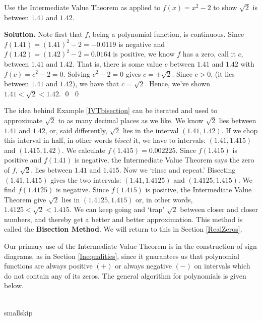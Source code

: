 

\begin{ex} \label{IVTbisection} Use the Intermediate Value Theorem as applied to $f(x) = x^2-2$ to show $\sqrt{2}$ is between $1.41$ and $1.42$.

\smallskip

{\bf Solution.} Note first that $f$, being a polynomial function, is continuous.  Since  $f(1.41) = (1.41)^2-2 = -0.0119$ is negative and $f(1.42) = (1.42)^2  -2 = 0.0164$ is positive, we know $f$ has a zero, call it $c$,  between $1.41$ and $1.42$.  That is, there is some value $c$ between $1.41$ and $1.42$ with  $f(c) = c^2-2 =0$. Solving $c^2-2 = 0$ gives $c = \pm \sqrt{2}$.  Since $c > 0$, (it lies between $1.41$ and $1.42$), we have that $c = \sqrt{2}$.  Hence, we've shown $1.41 < \sqrt{2} < 1.42$. \qed
\qed

\end{ex}

The idea behind Example \ref{IVTbisection}  can be iterated and used to approximate $\sqrt{2}$ to as many decimal places as we like. We know $\sqrt{2}$ lies between $1.41$ and $1.42$, or, said differently, $\sqrt{2}$ lies in the interval $(1.41, 1.42)$.  If we chop this interval in half, in other words \textit{bisect} it, we have to intervals: $(1.41, 1.415)$ and $(1.415, 1.42)$.  We calculate $f(1.415) = 0.002225$.  Since $f(1.415)$ is positive and  $f(1.41)$ is negative, the Intermediate Value Theorem says the zero of $f$, $\sqrt{2}$,  lies between $1.41$ and $1.415$.  Now we `rinse and repeat.' Bisecting  $(1.41, 1.415)$ gives the two intervals: $(1.41, 1.4125)$  and  $(1.4125, 1.415)$. We find $f(1.4125)$ is negative.  Since $f(1.415)$ is positive, the Intermediate Value Theorem give $\sqrt{2}$ lies in $(1.4125, 1.415)$ or, in other words, $1.4125 < \sqrt{2} < 1.415$.   We can keep going and `trap' $\sqrt{2}$ between closer and closer numbers, and thereby get a better and better approximation.  This method is called the  \textbf{Bisection Method}.  We will return to this in Section \ref{RealZeros}.

Our primary use of the Intermediate Value Theorem is in the construction of sign diagrams, as in Section \ref{Inequalities}, since it guarantees us that polynomial functions are always positive $(+)$ or always negative $(-)$ on intervals which do not contain any of its zeros.  The general algorithm for polynomials is given below.

\smallskip
\\smallskip 

